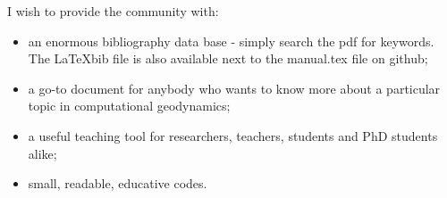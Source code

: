 
I wish to provide the community with:
\begin{itemize}
\item an enormous bibliography data base - simply search the pdf for keywords. The \LaTeX bib
 file is also available next to the manual.tex file on github;  
\item a go-to document for anybody who wants to know more about 
      a particular topic in computational geodynamics;
\item a useful teaching tool for researchers, teachers, students and PhD students alike; 
\item small, readable, educative codes. 
\end{itemize}

